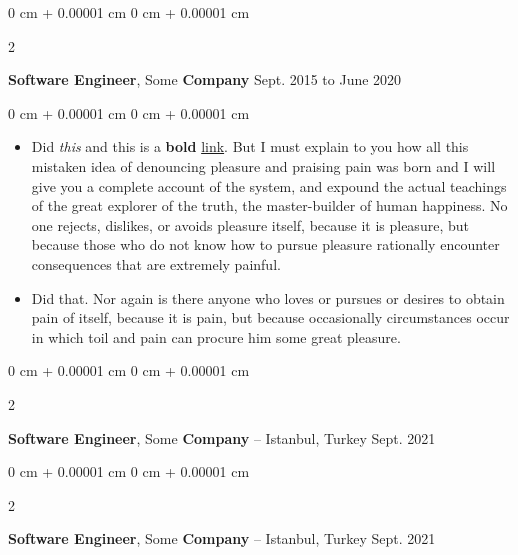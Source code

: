 \documentclass[10pt, letterpaper]{article}
\newenvironment{highlights}{
    \begin{itemize}[
        topsep=0.10 cm,
        parsep=0.10 cm,
        partopsep=0pt,
        itemsep=0pt,
        leftmargin=0 cm + 10pt
    ]
}{
    \end{itemize}
} %
\newenvironment{onecolentry}{
    \begin{adjustwidth}{
        0 cm + 0.00001 cm
    }{
        0 cm + 0.00001 cm
    }
}{
    \end{adjustwidth}
} %
\newenvironment{twocolentry}[2][]{
    \onecolentry
    \def\secondColumn{#2}
    \setcolumnwidth{\fill, 4.5 cm}
    \begin{paracol}{2}
}{
    \switchcolumn \raggedleft \secondColumn
    \end{paracol}
    \endonecolentry
} %
\begin{document}
        \vspace{0.2 cm}

        \begin{twocolentry}{
            Sept. 2015 to June 2020
        }
            \textbf{Software Engineer}, Some \textbf{Company}\end{twocolentry}

        \vspace{0.10 cm}
        \begin{onecolentry}
            \begin{highlights}
                \item Did \textit{this} and this is a \textbf{bold} \href{https://example.com}{link}. But I must explain to you how all this mistaken idea of denouncing pleasure and praising pain was born and I will give you a complete account of the system, and expound the actual teachings of the great explorer of the truth, the master-builder of human happiness. No one rejects, dislikes, or avoids pleasure itself, because it is pleasure, but because those who do not know how to pursue pleasure rationally encounter consequences that are extremely painful.
                \item Did that. Nor again is there anyone who loves or pursues or desires to obtain pain of itself, because it is pain, but because occasionally circumstances occur in which toil and pain can procure him some great pleasure.
            \end{highlights}
        \end{onecolentry}


        \vspace{0.2 cm}

        \begin{twocolentry}{
            Sept. 2021
        }
            \textbf{Software Engineer}, Some \textbf{Company} -- Istanbul, Turkey\end{twocolentry}



        \vspace{0.2 cm}

        \begin{twocolentry}{
            Sept. 2021
        }
            \textbf{Software Engineer}, Some \textbf{Company} -- Istanbul, Turkey\end{twocolentry}
\end{document}

